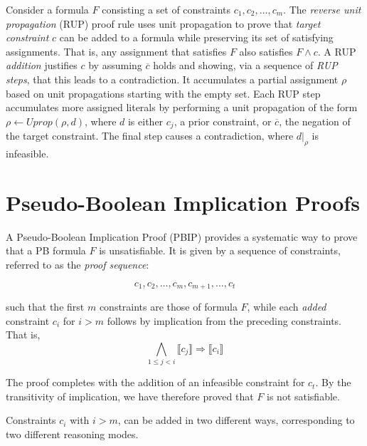 \message{ !name(FMCAD2024.tex)}\documentclass{fmcad}
\begin{document}
Consider a formula $F$ consisting a set of constraints $c_1, c_2, \dots, c_m$. The \textit{reverse
  unit propagation} (RUP) proof rule \cite{gocht2022certifying} uses unit propagation to prove
that \textit{target constraint} $c$ can be added to a formula while preserving its set of
satisfying assignments. That is, any assignment that satisfies $F$ also satisfies $F \land c$.
A RUP \textit{addition} justifies $c$ by assuming $\overline{c}$ holds and showing, via a sequence
of \textit{RUP steps}, that this leads to a contradiction. It accumulates a partial assignment
$\rho$ based on unit propagations starting with the empty set. Each RUP step accumulates more
assigned literals by performing a unit propagation of the form $\rho \leftarrow Uprop(\rho, d)$,
where $d$ is either $c_j$, a prior constraint, or $\overline{c}$, the negation of the target
constraint. The final step causes a contradiction, where $d|_\rho$ is infeasible.

\section{Pseudo-Boolean Implication Proofs}
A Pseudo-Boolean Implication Proof (PBIP) provides a systematic way to prove that a PB formula $F$
is unsatisfiable. It is given by a sequence of constraints, referred to as the
\textit{proof sequence}:

\[
  c_1, c_2, \dots, c_m, c_{m + 1}, \dots, c_t
\]

such that the first $m$ constraints are those of formula $F$, while each \textit{added} constraint
$c_i$ for $i > m$ follows by implication from the preceding constraints. That is,
\begin{equation}
  \label{eq:clausal-impl}
  \bigwedge_{1 \leq j < i} \llbracket c_j \rrbracket \Rightarrow \llbracket c_i \rrbracket
\end{equation}

The proof completes with the addition of an infeasible constraint for $c_t$. By the transitivity
of implication, we have therefore proved that $F$ is not satisfiable.

Constraints $c_i$ with $i > m$, can be added in two different ways, corresponding to two
different reasoning modes.
\end{document}
